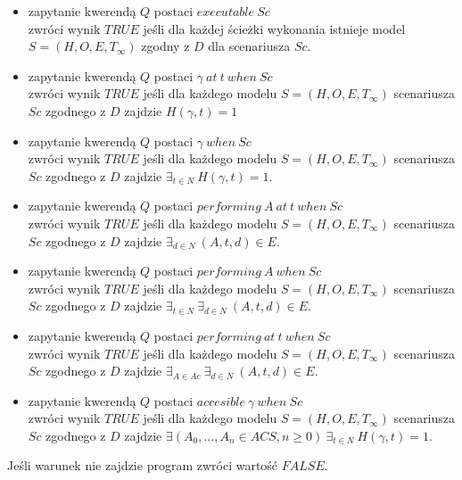 \begin{itemize}
	\item zapytanie kwerendą $Q$ postaci $executable\ Sc$\\ zwróci wynik $TRUE$ jeśli dla każdej ścieżki wykonania istnieje model $S=(H,O,E,T_{\infty})$ zgodny z $D$ dla scenariusza $Sc$.

	\item zapytanie kwerendą $Q$ postaci $\gamma\ at\ t\ when\ Sc$\\ zwróci wynik $TRUE$ jeśli dla każdego modelu $S=(H,O,E,T_{\infty})$ scenariusza $Sc$ zgodnego z $D$ zajdzie $H(\gamma,t)=1$
	\item zapytanie kwerendą $Q$ postaci $\gamma\ when\ Sc$\\ zwróci wynik $TRUE$ jeśli dla każdego modelu $S=(H,O,E,T_{\infty})$ scenariusza $Sc$ zgodnego z $D$ zajdzie $\exists_{t \in N}\ H(\gamma,t)=1$.

	\item zapytanie kwerendą $Q$ postaci $performing\ A\ at\ t\ when\ Sc$\\ zwróci wynik $TRUE$ jeśli dla każdego modelu $S=(H,O,E,T_{\infty})$ scenariusza $Sc$ zgodnego z $D$ zajdzie $\exists_{d \in N}\ (A,t,d) \in E$.
	\item zapytanie kwerendą $Q$ postaci $performing\ A\ when\ Sc$\\ zwróci wynik $TRUE$ jeśli dla każdego modelu $S=(H,O,E,T_{\infty})$ scenariusza $Sc$ zgodnego z $D$ zajdzie $\exists_{t \in N}\ \exists_{d \in N}\ (A,t,d) \in E$.
	\item zapytanie kwerendą $Q$ postaci $performing\ at\ t\ when\ Sc$\\ zwróci wynik $TRUE$ jeśli dla każdego modelu $S=(H,O,E,T_{\infty})$ scenariusza $Sc$ zgodnego z $D$ zajdzie $\exists_{A \in Ac}\ \exists_{d \in N}\ (A,t,d) \in E$.

	\item zapytanie kwerendą $Q$ postaci $accesible\ \gamma\ when\ Sc$\\ zwróci wynik $TRUE$ jeśli dla każdego modelu $S=(H,O,E,T_{\infty})$ scenariusza $Sc$ zgodnego z $D$ zajdzie $\exists(A_{0},...,A_{n} \in ACS, n \geqslant 0)\  \exists_{t \in N}\ H(\gamma,t)=1$.
\end{itemize}

\begin{remark}
   Jeśli warunek nie zajdzie program zwróci wartość $FALSE$.
\end{remark}
